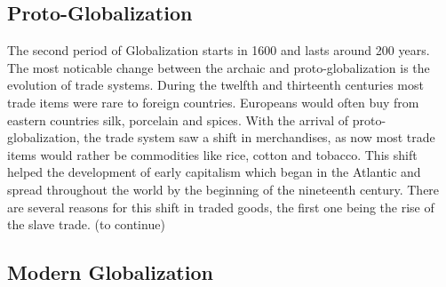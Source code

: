 \documentclass[12pt]{article}
\begin{document}
\subsection{Proto-Globalization}

The second period of Globalization starts in 1600 and lasts around 200 years. The most noticable change between the archaic and proto-globalization is the evolution of trade systems. During the twelfth and thirteenth centuries most trade items were rare to foreign countries. Europeans would often buy from eastern countries silk, porcelain and spices. With the arrival of proto-globalization, the trade system saw a shift in merchandises, as now most trade items would rather be commodities like rice, cotton and tobacco. This shift helped the development of early capitalism which began in the Atlantic and spread throughout the world by the beginning of the nineteenth century. There are several reasons for this shift in traded goods, the first one being the rise of the slave trade. (to continue)

\subsection{Modern Globalization}
\end{document}

